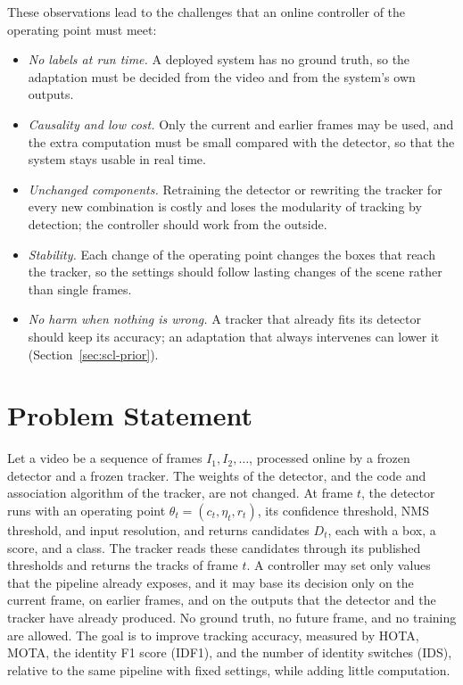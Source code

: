 These observations lead to the challenges that an online controller of the operating point must meet:
\begin{itemize}
\item \emph{No labels at run time.} A deployed system has no ground truth, so the adaptation must be decided from the video and from the system's own outputs.
\item \emph{Causality and low cost.} Only the current and earlier frames may be used, and the extra computation must be small compared with the detector, so that the system stays usable in real time.
\item \emph{Unchanged components.} Retraining the detector or rewriting the tracker for every new combination is costly and loses the modularity of tracking by detection; the controller should work from the outside.
\item \emph{Stability.} Each change of the operating point changes the boxes that reach the tracker, so the settings should follow lasting changes of the scene rather than single frames.
\item \emph{No harm when nothing is wrong.} A tracker that already fits its detector should keep its accuracy; an adaptation that always intervenes can lower it (Section~\ref{sec:scl-prior}).
\end{itemize}

\section{Problem Statement}\label{sec:intro-problem}
Let a video be a sequence of frames $I_1, I_2, \dots$, processed online by a frozen detector and a frozen tracker. The weights of the detector, and the code and association algorithm of the tracker, are not changed. At frame $t$, the detector runs with an operating point $\theta_t=(c_t,\eta_t,r_t)$, its confidence threshold, NMS threshold, and input resolution, and returns candidates $D_t$, each with a box, a score, and a class. The tracker reads these candidates through its published thresholds and returns the tracks of frame $t$. A controller may set only values that the pipeline already exposes, and it may base its decision only on the current frame, on earlier frames, and on the outputs that the detector and the tracker have already produced. No ground truth, no future frame, and no training are allowed. The goal is to improve tracking accuracy, measured by HOTA, MOTA, the identity F1 score (IDF1), and the number of identity switches (IDS), relative to the same pipeline with fixed settings, while adding little computation.

